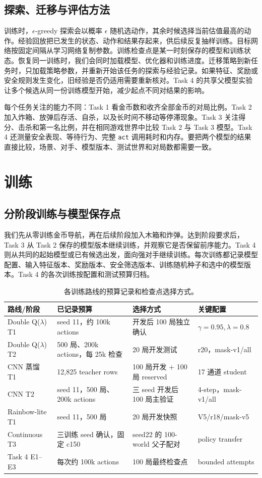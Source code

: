 \documentclass[UTF8,11pt,a4paper,fontset=none]{ctexart}
\begin{document}
\subsection{探索、迁移与评估方法}
训练时，$\epsilon$-greedy 探索会以概率 $\epsilon$ 随机选动作，其余时候选择当前估值最高的动作。经验回放把已发生的状态、动作和结果存起来，供后续反复抽样训练。目标网络按固定间隔从学习网络复制参数。训练检查点是某一时刻保存的模型和训练状态。恢复同一训练时，我们会同时加载模型、优化器和训练进度。迁移策略到新任务时，只加载策略参数，并重新开始该任务的探索与经验记录。如果特征、奖励或安全规则发生变化，旧经验是否仍适用需要重新核对。Task 4 的共享父模型实验让多个候选从同一份训练模型开始，减少起点不同对结果的影响。

每个任务关注的能力不同：Task 1 看金币数和收齐全部金币的对局比例。Task 2 加入炸箱、放弹后存活、自杀，以及长时间不移动等停滞现象。Task 3 关注得分、击杀和第一名比例，并在相同游戏世界中比较 Task 2 与 Task 3 模型。Task 4 还测量安全表现、等待行为、完整 \texttt{act} 调用耗时和内存。要把两个模型的结果直接比较，场景、对手、模型版本、测试世界和对局数都需要一致。

\section{训练}
\subsection{分阶段训练与模型保存点}
我们先从零训练金币导航，再在后续阶段加入木箱和炸弹。达到阶段要求后，Task 3 从 Task 2 保存的模型版本继续训练，并观察它是否保留前序能力。Task 4 则从共同的起始模型或已有候选出发，面向强对手继续训练。每次训练都记录模型配置、输入特征版本、奖励版本、安全筛选版本、训练随机种子和选中的模型版本。Task 4 的各次训练按配置和测试预算归档。

\begin{table}[H]\centering\small
\caption{各训练路线的预算记录和检查点选择方式。}\label{tab:training}
\begin{tabularx}{\linewidth}{lXXl}\toprule
路线/阶段 & 已记录预算 & 选择方式 & 关键配置\\\midrule
Double Q($\lambda$) T1 & seed 11，约 100k actions & 开发后 100 局独立确认 & $\gamma=0.95,\lambda=0.8$\\
Double Q($\lambda$) T2 & 500 局、200k actions，每 25k 检查 & 20 局开发测试 & r20，mask-v1/all\\
CNN 蒸馏 T1 & 12,825 teacher rows & 100 局开发 + 100 局 reserved & 17 通道 student\\
CNN T2 & seed 11，500 局、200k actions & 三 seed 开发后 100 局主验证 & 4-step，mask-v1/all\\
Rainbow-lite T1 & seed 11，500 局 & 20 局开发快照 & V5/r18/mask-v5\\
Continuous T3 & 三训练 seed 确认，固定 c150 & seed22 的 100-world 父子配对 & policy transfer\\
Task 4 E1--E3 & 每次约 100k actions & 100 局最终检查点 & bounded attempts\\\bottomrule
\end{tabularx}
\end{table}
\end{document}
